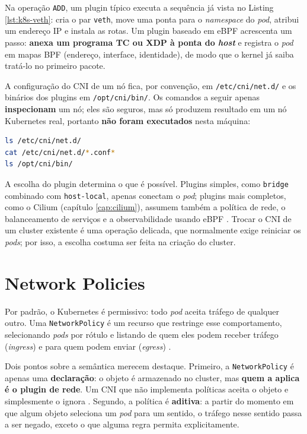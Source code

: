 Na operação \texttt{ADD}, um plugin típico executa a sequência já vista no
Listing \ref{lst:k8s-veth}: cria o par \texttt{veth}, move uma ponta para o
\textit{namespace} do \textit{pod}, atribui um endereço IP e instala as rotas. Um
plugin baseado em eBPF acrescenta um passo: \textbf{anexa um programa TC ou XDP à
ponta do \textit{host}} e registra o \textit{pod} em mapas BPF (endereço, interface,
identidade), de modo que o kernel já saiba tratá-lo no primeiro pacote.

A configuração do CNI de um nó fica, por convenção, em \texttt{/etc/cni/net.d/} e os
binários dos plugins em \texttt{/opt/cni/bin/}. Os comandos a seguir apenas
\textbf{inspecionam} um nó; eles são seguros, mas só produzem resultado em um nó
Kubernetes real, portanto \textbf{não foram executados} nesta máquina:

\begin{lstlisting}[language=bash, caption={Inspeção da configuração CNI em um nó (comando de cluster, não executado).}, label=lst:k8s-cni-inspect]
ls /etc/cni/net.d/
cat /etc/cni/net.d/*.conf*
ls /opt/cni/bin/
\end{lstlisting}

A escolha do plugin determina o que é possível. Plugins simples, como \texttt{bridge}
combinado com \texttt{host-local}, apenas conectam o \textit{pod}; plugins mais
completos, como o Cilium (capítulo \ref{cap:cilium}), assumem também a política de
rede, o balanceamento de serviços e a observabilidade usando eBPF \cite{ciliumdocs}.
Trocar o CNI de um cluster existente é uma operação delicada, que normalmente exige
reiniciar os \textit{pods}; por isso, a escolha costuma ser feita na criação do
cluster.

\section{Network Policies}

Por padrão, o Kubernetes é permissivo: todo \textit{pod} aceita tráfego de qualquer
outro. Uma \texttt{NetworkPolicy} é um recurso que restringe esse comportamento,
selecionando \textit{pods} por rótulo e listando de quem eles podem receber tráfego
(\textit{ingress}) e para quem podem enviar (\textit{egress}) \cite{k8snetpol}.

Dois pontos sobre a semântica merecem destaque. Primeiro, a \texttt{NetworkPolicy} é
apenas uma \textbf{declaração}: o objeto é armazenado no cluster, mas \textbf{quem a
aplica é o plugin de rede}. Um CNI que não implementa políticas aceita o objeto e
simplesmente o ignora \cite{k8snetpol}. Segundo, a política é \textbf{aditiva}: a partir do momento em que algum
objeto seleciona um \textit{pod} para um sentido, o tráfego nesse sentido passa a ser
negado, exceto o que alguma regra permita explicitamente.

